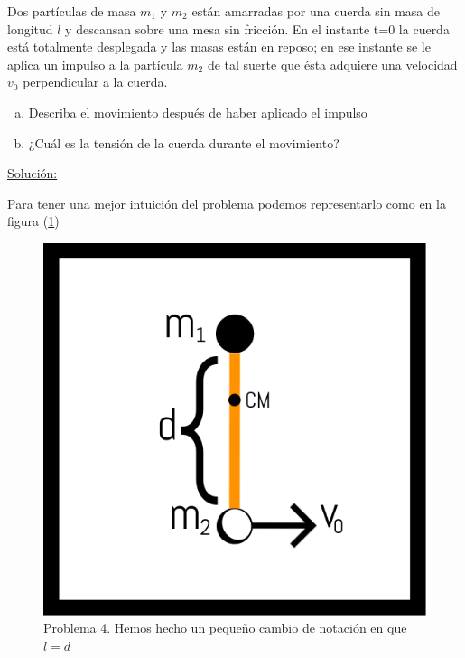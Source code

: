 \documentclass[a4paper,10pt]{article}
\numberwithin{equation}{section}
\begin{document}
Dos partículas de masa $m_1$ y $m_2$ están amarradas por una cuerda sin masa de 
longitud $l$ y descansan sobre una mesa sin fricción. En el instante t=0 la cuerda
está totalmente desplegada y las masas están en reposo; en ese instante se le aplica
un impulso a la partícula $m_2$ de tal suerte que ésta adquiere una velocidad $v_0$ 
perpendicular a la cuerda.

\begin{enumerate}[a)]
 \item Describa el movimiento después de haber aplicado el impulso
 \item ¿Cuál es la tensión de la cuerda durante el movimiento?
\end{enumerate}

\vspace{.3cm}

\underline{Solución:}\vspace{.3cm}

Para tener una mejor intuición del problema podemos representarlo como en la figura (\ref{fig:problema4})

\begin{figure}[ht]
 \centering
\includegraphics[scale=0.4]{problema4fig1}
\caption{Problema 4. Hemos hecho un pequeño cambio de notación en que $l=d$}
\label{fig:problema4}
\end{figure}
\end{document}
